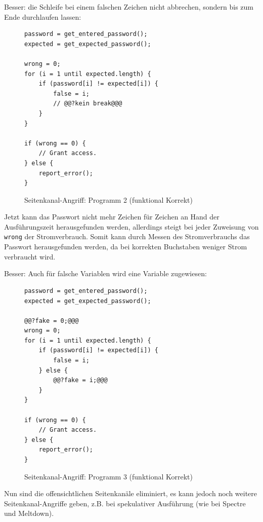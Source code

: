 \documentclass[a4paper, 11pt, accentcolor = tud3b]{tudreport}
\begin{document}
	            Besser: die Schleife bei einem falschen Zeichen nicht abbrechen, sondern bis zum Ende durchlaufen lassen:
	            \begin{figure}[H]
	            	\centering
	            	\begin{lstlisting}
password = get_entered_password();
expected = get_expected_password();

wrong = 0;
for (i = 1 until expected.length) {
	if (password[i] != expected[i]) {
		false = i;
		// @@?kein break@@@
	}
}

if (wrong == 0) {
	// Grant access.
} else {
	report_error();
}
\end{lstlisting}
	            	\caption{Seitenkanal-Angriff: Programm 2 (funktional Korrekt)}
	            \end{figure}
	            Jetzt kann das Passwort nicht mehr Zeichen für Zeichen an Hand der Ausführungszeit herausgefunden werden, allerdings steigt bei jeder Zuweisung von \texttt{wrong} der Stromverbrauch. Somit kann durch Messen des Stromverbrauchs das Passwort herausgefunden werden, da bei korrekten Buchstaben weniger Strom verbraucht wird.
	            
	            Besser: Auch für falsche Variablen wird eine Variable zugewiesen:
				\begin{figure}[H]
				\centering
				\begin{lstlisting}
password = get_entered_password();
expected = get_expected_password();

@@?fake = 0;@@@
wrong = 0;
for (i = 1 until expected.length) {
	if (password[i] != expected[i]) {
		false = i;
	} else {
		@@?fake = i;@@@
	}
}

if (wrong == 0) {
	// Grant access.
} else {
	report_error();
}
\end{lstlisting}
					\caption{Seitenkanal-Angriff: Programm 3 (funktional Korrekt)}
				\end{figure}
				Nun sind die offensichtlichen Seitenkanäle eliminiert, es kann jedoch noch weitere Seitenkanal-Angriffe geben, z.B. bei spekulativer Ausführung (wie bei Spectre und Meltdown).
\end{document}
